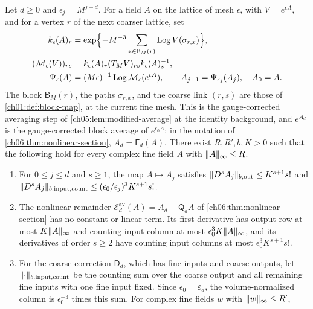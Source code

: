 \begin{lemma}\label{ch07:lem:word-majorant}
Let $d\ge0$ and $\epsilon_j=M^{j-d}$. For a field $A$ on the lattice of mesh $\epsilon$, with $V=e^{\epsilon A}$, and for a vertex $r$ of the next coarser lattice, set
\begin{equation}\label{ch07:eq:modified-word}
 \begin{aligned}
 k_\epsilon(A)_r&=\exp\Bigl\{-M^{-3}\sum_{x\in\mathsf B_M(r)}\operatorname{Log} V(\sigma_{r,x})\Bigr\},\\
 (\mathcal M_\epsilon(V))_{rs}&=k_\epsilon(A)_r(T_MV)_{rs}k_\epsilon(A)_s^{-1},\\
 \Psi_\epsilon(A)&=(M\epsilon)^{-1}\operatorname{Log}\mathcal M_\epsilon(e^{\epsilon A}),\qquad A_{j+1}=\Psi_{\epsilon_j}(A_j),\quad A_0=A .
 \end{aligned}
\end{equation}
The block $\mathsf B_M(r)$, the paths $\sigma_{r,x}$, and the coarse link $(r,s)$ are those of \cref{ch01:def:block-map}, at the current fine mesh. This is the gauge-corrected averaging step of \cref{ch05:lem:modified-average} at the identity background, and $e^{A_d}$ is the gauge-corrected block average of $e^{\epsilon_0A}$; in the notation of \cref{ch06:thm:nonlinear-section}, $A_d=\mathsf F_d(A)$. There exist $R,R',b,K>0$ such that the following hold for every complex fine field $A$ with $\lVert A\rVert_\infty\le R$.
\begin{enumerate}
\item For $0\le j\le d$ and $s\ge1$, the map $A\mapsto A_j$ satisfies $\lVert D^sA_j\rVert_{b,\mathrm{out}}\le K^{s+1}s!$ and $\lVert D^sA_j\rVert_{b,\mathrm{input,count}}\le(\epsilon_0/\epsilon_j)^3K^{s+1}s!$.
\item The nonlinear remainder $\mathscr E_d^{\mathrm{av}}(A)=A_d-\mathsf Q_dA$ of \cref{ch06:thm:nonlinear-section} has no constant or linear term. Its first derivative has output row at most $K\lVert A\rVert_\infty$ and counting input column at most $\epsilon_0^3K\lVert A\rVert_\infty$, and its derivatives of order $s\ge2$ have counting input columns at most $\epsilon_0^3K^{s+1}s!$.
\item For the coarse correction $\mathsf D_d$, which has fine inputs and coarse outputs, let $\lVert \cdot\rVert_{b,\mathrm{input,count}}$ be the counting sum over the coarse output and all remaining fine inputs with one fine input fixed. Since $\epsilon_0=\varepsilon_d$, the volume-normalized column is $\epsilon_0^{-3}$ times this sum. For complex fine fields $w$ with $\lVert w\rVert_\infty\le R'$,
\begin{equation}\label{ch07:eq:D-majorant}

\end{equation}
\end{enumerate}
\end{lemma}
